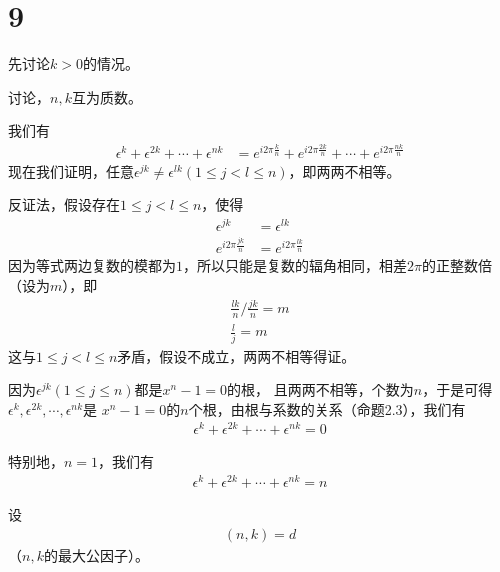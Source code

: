 \documentclass{article}
\begin{document}
\section*{9}

先讨论$k > 0$的情况。

讨论，$n, k$互为质数。

我们有
\begin{align*}
  \epsilon^k + \epsilon^{2k} + \cdots + \epsilon^{nk}
   & = e^{i 2\pi \frac{k}{n}} + e^{i 2\pi \frac{2k}{n}} + \cdots + e^{i 2\pi \frac{nk}{n}}
\end{align*}
现在我们证明，任意$\epsilon^{jk} \neq \epsilon^{lk}(1 \leq j < l \leq n)$，即两两不相等。

反证法，假设存在$1 \leq j < l \leq n$，使得
\begin{align*}
  \epsilon^{jk}           & = \epsilon^{lk}           \\
  e^{i 2\pi \frac{jk}{n}} & = e^{i 2\pi \frac{lk}{n}}
\end{align*}
因为等式两边复数的模都为$1$，所以只能是复数的辐角相同，相差$2\pi$的正整数倍（设为$m$），即
\begin{align*}
  \frac{lk}{n} / \frac{jk}{n} = m \\
  \frac{l}{j} = m
\end{align*}
这与$1 \leq j < l \leq n$矛盾，假设不成立，两两不相等得证。

因为$\epsilon^{jk} (1 \leq j \leq n)$都是$x^n - 1 = 0$的根，
且两两不相等，个数为$n$，于是可得$\epsilon^{k}, \epsilon^{2k}, \cdots, \epsilon^{nk}$是
$x^n - 1 = 0$的$n$个根，由根与系数的关系（命题2.3），我们有
\begin{align*}
  \epsilon^{k} + \epsilon^{2k} + \cdots + \epsilon^{nk} = 0
\end{align*}

特别地，$n = 1$，我们有
\begin{align*}
  \epsilon^k + \epsilon^{2k} + \cdots + \epsilon^{nk} = n
\end{align*}

设
\begin{align*}
  (n, k) = d
\end{align*}
（$n, k$的最大公因子）。
\end{document}
